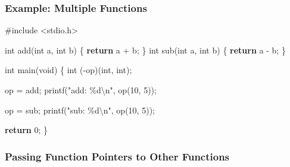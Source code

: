 \documentclass[
  letterpaper,
  DIV=11,
  numbers=noendperiod]{scrreprt}
\newenvironment{Shaded}{\begin{snugshade}}{\end{snugshade}}
\newcommand{\ControlFlowTok}[1]{\textcolor[rgb]{0.00,0.23,0.31}{\textbf{#1}}}
\newcommand{\DataTypeTok}[1]{\textcolor[rgb]{0.68,0.00,0.00}{#1}}
\newcommand{\DecValTok}[1]{\textcolor[rgb]{0.68,0.00,0.00}{#1}}
\newcommand{\ImportTok}[1]{\textcolor[rgb]{0.00,0.46,0.62}{#1}}
\newcommand{\NormalTok}[1]{\textcolor[rgb]{0.00,0.23,0.31}{#1}}
\newcommand{\OperatorTok}[1]{\textcolor[rgb]{0.37,0.37,0.37}{#1}}
\newcommand{\PreprocessorTok}[1]{\textcolor[rgb]{0.68,0.00,0.00}{#1}}
\newcommand{\SpecialCharTok}[1]{\textcolor[rgb]{0.37,0.37,0.37}{#1}}
\newcommand{\StringTok}[1]{\textcolor[rgb]{0.13,0.47,0.30}{#1}}
\begin{document}
\subsubsection{Example: Multiple
Functions}\label{example-multiple-functions}

\begin{Shaded}
\begin{Highlighting}[]
\PreprocessorTok{\#include }\ImportTok{\textless{}stdio.h\textgreater{}}

\DataTypeTok{int}\NormalTok{ add}\OperatorTok{(}\DataTypeTok{int}\NormalTok{ a}\OperatorTok{,} \DataTypeTok{int}\NormalTok{ b}\OperatorTok{)} \OperatorTok{\{} \ControlFlowTok{return}\NormalTok{ a }\OperatorTok{+}\NormalTok{ b}\OperatorTok{;} \OperatorTok{\}}
\DataTypeTok{int}\NormalTok{ sub}\OperatorTok{(}\DataTypeTok{int}\NormalTok{ a}\OperatorTok{,} \DataTypeTok{int}\NormalTok{ b}\OperatorTok{)} \OperatorTok{\{} \ControlFlowTok{return}\NormalTok{ a }\OperatorTok{{-}}\NormalTok{ b}\OperatorTok{;} \OperatorTok{\}}

\DataTypeTok{int}\NormalTok{ main}\OperatorTok{(}\DataTypeTok{void}\OperatorTok{)} \OperatorTok{\{}
    \DataTypeTok{int} \OperatorTok{({-}}\NormalTok{op}\OperatorTok{)(}\DataTypeTok{int}\OperatorTok{,} \DataTypeTok{int}\OperatorTok{);}

\NormalTok{    op }\OperatorTok{=}\NormalTok{ add}\OperatorTok{;}
\NormalTok{    printf}\OperatorTok{(}\StringTok{"add: }\SpecialCharTok{\%d\textbackslash{}n}\StringTok{"}\OperatorTok{,}\NormalTok{ op}\OperatorTok{(}\DecValTok{10}\OperatorTok{,} \DecValTok{5}\OperatorTok{));}

\NormalTok{    op }\OperatorTok{=}\NormalTok{ sub}\OperatorTok{;}
\NormalTok{    printf}\OperatorTok{(}\StringTok{"sub: }\SpecialCharTok{\%d\textbackslash{}n}\StringTok{"}\OperatorTok{,}\NormalTok{ op}\OperatorTok{(}\DecValTok{10}\OperatorTok{,} \DecValTok{5}\OperatorTok{));}

    \ControlFlowTok{return} \DecValTok{0}\OperatorTok{;}
\OperatorTok{\}}
\end{Highlighting}
\end{Shaded}

\subsubsection{Passing Function Pointers to Other
Functions}\label{passing-function-pointers-to-other-functions}
\end{document}
